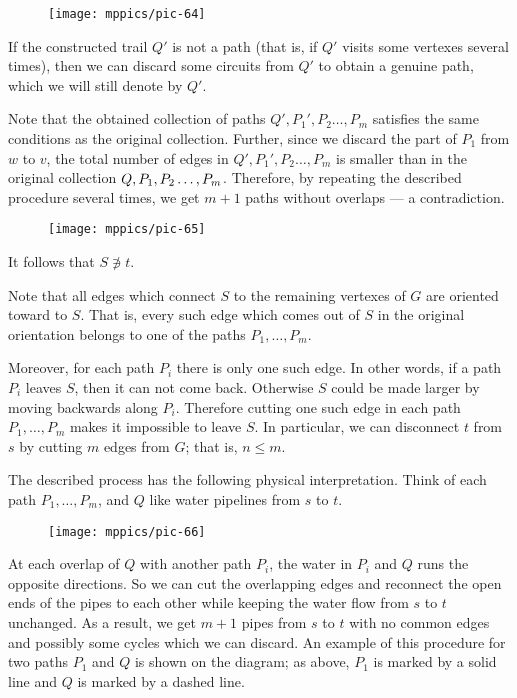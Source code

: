 \begin{wrapfigure}{o}{30 mm}
\vskip-0mm
\centering
\texttt{[image: mppics/pic-64]}
\vskip0mm
\end{wrapfigure}
If the constructed trail $Q'$ is not a path (that is, if $Q'$ visits some vertexes several times), then we can discard some circuits from $Q'$ to obtain a genuine path, 
which we will still denote by $Q'$.

Note that the obtained collection of paths $Q', P_1',P_2\dots,P_m$ satisfies the same conditions as the original collection.
Further, since we discard the part of $P_1$ from $w$ to $v$, the total number of edges in $Q', P_1',P_2\dots,P_m$
is smaller than in the original collection $Q, P_1,P_2\z\dots,P_m$.
Therefore, by repeating the described procedure several times, we get $m+1$ paths without overlaps --- a contradiction.

{

\begin{wrapfigure}{r}{40 mm}
\vskip-2mm
\centering
\texttt{[image: mppics/pic-65]}
\vskip0mm
\end{wrapfigure}

It follows that $S\not\ni t$.

Note that all edges which connect $S$ to the remaining vertexes of $G$ are oriented toward to $S$.
That is, every such edge which comes out of $S$ in the original orientation belongs to one of the paths $P_1,\dots,P_m$.

Moreover, for each path $P_i$ there is only one such edge.
In other words, if a path $P_i$ leaves $S$, then it can not come back. 
Otherwise $S$ could be made larger by moving backwards along $P_i$.
Therefore cutting one such edge in each path $P_1,\dots,P_m$ makes it impossible to leave $S$.
In particular, we can disconnect $t$ from $s$ by cutting $m$ edges from $G$; that is, $n\le m$.
\qeds

}

The described process has the following physical interpretation.
Think of each path $P_1,\dots,P_m$, and $Q$ like water pipelines from $s$ to $t$.
\begin{figure}[h!]%
\vskip0mm
\centering
\texttt{[image: mppics/pic-66]}
\vskip0mm
\end{figure}
At each overlap of $Q$ with another path $P_i$, the water in $P_i$ and $Q$ runs the opposite directions.
So we can cut the overlapping edges and reconnect the open ends of the pipes to each other while keeping the water flow from $s$ to $t$ unchanged.
As a result, we get $m+1$ pipes from $s$ to $t$ with no common edges and possibly some cycles which we can discard.
An example of this procedure for two paths $P_1$ and $Q$ is shown on the diagram;
as above, $P_1$ is marked by a solid line and $Q$ is marked by a dashed line.

